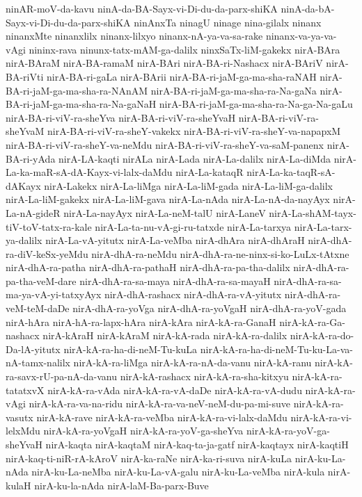 {ninAR-moV-da-kavu
ninA-da-BA-Sayx-vi-Di-du-da-parx-shiKA
ninA-da-bA-Sayx-vi-Di-du-da-parx-shiKA
ninAnxTa
ninagU
ninage
nina-gilalx
ninanx
ninanxMte
ninanxlilx
ninanx-lilxyo
ninanx-nA-ya-va-sa-rake
ninanx-va-ya-va-vAgi
nininx-rava
ninunx-tatx-mAM-ga-dalilx
ninxSaTx-liM-gakekx
nirA-BAra
nirA-BAraM
nirA-BA-ramaM
nirA-BAri
nirA-BA-ri-Nashacx
nirA-BAriV
nirA-BA-riVti
nirA-BA-ri-gaLa
nirA-BArii
nirA-BA-ri-jaM-ga-ma-sha-raNAH
nirA-BA-ri-jaM-ga-ma-sha-ra-NAnAM
nirA-BA-ri-jaM-ga-ma-sha-ra-Na-gaNa
nirA-BA-ri-jaM-ga-ma-sha-ra-Na-gaNaH
nirA-BA-ri-jaM-ga-ma-sha-ra-Na-ga-Na-gaLu
nirA-BA-ri-viV-ra-sheYva
nirA-BA-ri-viV-ra-sheYvaH
nirA-BA-ri-viV-ra-sheYvaM
nirA-BA-ri-viV-ra-sheY-vakekx
nirA-BA-ri-viV-ra-sheY-va-napapxM
nirA-BA-ri-viV-ra-sheY-va-neMdu
nirA-BA-ri-viV-ra-sheY-va-saM-panenx
nirA-BA-ri-yAda
nirA-LA-kaqti
nirALa
nirA-Lada
nirA-La-dalilx
nirA-La-diMda
nirA-La-ka-maR-sA-dA-Kayx-vi-lalx-daMdu
nirA-La-kataqR
nirA-La-ka-taqR-sA-dAKayx
nirA-Lakekx
nirA-La-liMga
nirA-La-liM-gada
nirA-La-liM-ga-dalilx
nirA-La-liM-gakekx
nirA-La-liM-gava
nirA-La-nAda
nirA-La-nA-da-nayAyx
nirA-La-nA-gideR
nirA-La-nayAyx
nirA-La-neM-talU
nirA-LaneV
nirA-La-shAM-tayx-tiV-toV-tatx-ra-kale
nirA-La-ta-nu-vA-gi-ru-tatxde
nirA-La-tarxya
nirA-La-tarx-ya-dalilx
nirA-La-vA-yitutx
nirA-La-veMba
nirA-dhAra
nirA-dhAraH
nirA-dhA-ra-diV-keSx-yeMdu
nirA-dhA-ra-neMdu
nirA-dhA-ra-ne-ninx-si-ko-LuLx-tAtxne
nirA-dhA-ra-patha
nirA-dhA-ra-pathaH
nirA-dhA-ra-pa-tha-dalilx
nirA-dhA-ra-pa-tha-veM-dare
nirA-dhA-ra-sa-maya
nirA-dhA-ra-sa-mayaH
nirA-dhA-ra-sa-ma-ya-vA-yi-tatxyAyx
nirA-dhA-rashacx
nirA-dhA-ra-vA-yitutx
nirA-dhA-ra-veM-teM-daDe
nirA-dhA-ra-yoVga
nirA-dhA-ra-yoVgaH
nirA-dhA-ra-yoV-gada
nirA-hAra
nirA-hA-ra-lapx-hAra
nirA-kAra
nirA-kA-ra-GanaH
nirA-kA-ra-Ga-nashacx
nirA-kAraH
nirA-kAraM
nirA-kA-rada
nirA-kA-ra-dalilx
nirA-kA-ra-do-Da-lA-yitutx
nirA-kA-ra-ha-di-neM-Tu-kuLa
nirA-kA-ra-ha-di-neM-Tu-ku-La-va-nA-tamx-nalilx
nirA-kA-ra-liMga
nirA-kA-ra-nA-da-vanu
nirA-kA-ranu
nirA-kA-ra-savx-rU-pa-nA-da-vanu
nirA-kA-rashacx
nirA-kA-ra-sha-kitxyu
nirA-kA-ra-tatatxvX
nirA-kA-ra-vAda
nirA-kA-ra-vA-daDe
nirA-kA-ra-vA-dudu
nirA-kA-ra-vAgi
nirA-kA-ra-va-na-ridu
nirA-kA-ra-va-neV-neM-du-pa-mi-suve
nirA-kA-ra-vasutx
nirA-kA-rave
nirA-kA-ra-veMba
nirA-kA-ra-vi-lalx-daMdu
nirA-kA-ra-vi-lelxMdu
nirA-kA-ra-yoVgaH
nirA-kA-ra-yoV-ga-sheYva
nirA-kA-ra-yoV-ga-sheYvaH
nirA-kaqta
nirA-kaqtaM
nirA-kaq-ta-ja-gatf
nirA-kaqtayx
nirA-kaqtiH
nirA-kaq-ti-niR-rA-kAroV
nirA-ka-raNe
nirA-ka-ri-suva
nirA-kuLa
nirA-ku-La-nAda
nirA-ku-La-neMba
nirA-ku-La-vA-galu
nirA-ku-La-veMba
nirA-kula
nirA-kulaH
nirA-ku-la-nAda
nirA-laM-Ba-parx-Buve
}
